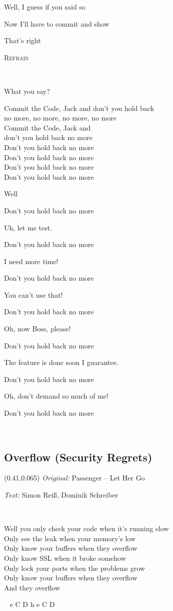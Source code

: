 \documentclass[11pt,a5paper]{article}
\makeatletter
\newcommand\chord[2][l]{\makebox[0pt][#1]{\begin{tabular}[b]{@{}l@{}}#2\\\mbox{}\end{tabular}}}
\newcommand\refrain[1]{\begin{tcolorbox}#1\end{tcolorbox} \ }
\newcommand{\refrefrain}{\refrain{\textsc{Refrain}} \ }
\newcommand\songinfoshort[2]{\begin{textblock}{0.5}(0.41,0.065)
			\footnotesize 
			\hfill \textit{Original:} #1
			
			\hfill  \textit{Text:} #2
		\end{textblock}}
\makeatother
\begin{document}
	\hfill Well, I guess if you said so
	
	\hfill Now I’ll have to commit and show 
	
	That’s right \\
	
	\refrefrain
	
	\hfill What you say?
	
	\refrain{
		Commit the Code, Jack and don’t you hold back \\
		no more, no more, no more, no more \\
		Commit the Code, Jack and \\ don’t you hold back no more \\
		Don’t you hold back no more \\
		Don’t you hold back no more \\
		Don’t you hold back no more \\
		Don’t you hold back no more
		
		\hfill Well
		
		Don’t you hold back no more
		
		\hfill Uh, let me test.
		
		Don’t you hold back no more
		
		\hfill I need more time!
		
		Don’t you hold back no more
		
		\hfill You can’t use that!
		
		Don’t you hold back no more
		
		\hfill Oh, now Boss, please!
		
		Don’t you hold back no more
		
		\hfill The feature is done soon I guarantee.
		
		Don’t you hold back no more
		
		\hfill Oh, don’t demand so much of me!
		
		Don’t you hold back no more}

\pagebreak

\subsection{Overflow (Security Regrets)}
\songinfoshort{Passenger – Let Her Go}{Simon Reiß, Dominik Schreiber}
\ \\

\refrain{
	Well you only check your \chord{C}code when it’s running slow\chord{G} \\
	Only see the \chord{D}leak when your memory’s low\chord{e} \\
	Only know your \chord{C}buffers when they overflow\chord{G} \ \ \chord{D} \\
	Only know SS\chord{C}L when it broke somehow\chord{G} \\
	Only lock your \chord{D}ports when the problems grow\chord{e} \\
	Only know your \chord{C}buffers when they overflow\chord{G} \ \ \chord{D} \\
	And they overflow} e C D h e C D \\
\end{document}
